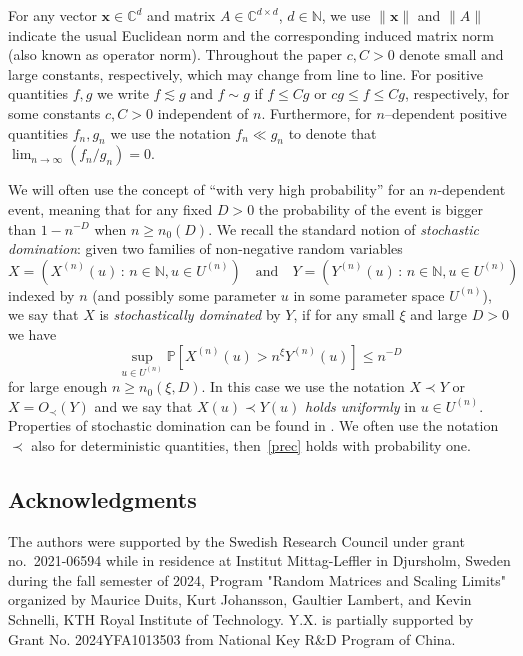 \documentclass[10pt,reqno]{amsart}
\newcommand{\N}{{\mathbb{N}}}
\newcommand{\C}{{\mathbb{C}}}
\newcommand{\<}{\langle}
\renewcommand{\>}{\rangle}
\numberwithin{equation}{section}
\begin{document}
For any vector $\mathbf{x} \in \C^{d}$ and matrix $A\in \C^{d \times d}$, $d\in \N$, we use $\lVert\mathbf{x}\rVert$ and $\lVert A\rVert$ indicate the usual Euclidean norm and the corresponding induced matrix norm (also known as operator norm). 
Throughout the paper $c,C>0$ denote small and large constants, respectively, which may change from line to line.  For positive quantities $f,g$ we write $f\lesssim g$ and $f\sim g$ if $f \le C g$ or $c g\le f\le Cg$, respectively, for some constants $c,C>0$ independent of $n$. Furthermore, for $n$--dependent positive
quantities $f_n,g_n$ we use the notation $f_n\ll g_n$ to denote that $\lim_{n\to\infty} (f_n/g_n)=0$. 



We will often use the concept of ``with very high probability'' for an $n$-dependent event, meaning that for any fixed $D>0$ the probability of the event is bigger than $1-n^{-D}$ when $n\ge n_0(D)$. We recall the standard notion of \emph{stochastic domination}:  
given two families of non-negative random variables
\[
X=\left(X^{(n)}(u) \,:\, n\in\N, u\in U^{(n)}\right)\quad\text{and}\quad Y=\left(Y^{(n)}(u) \,:\, n\in\N, u\in U^{(n)}\right)
\] 
indexed by $n$ (and possibly some parameter $u$  in some parameter space $U^{(n)}$), 
we say that $X$ is {\it stochastically dominated} by $Y$, if for any small $\xi$ and large $D>0$ we have 
\begin{equation}
	\label{prec}
	\sup_{u\in U^{(n)}} \mathbb{P}\left[X^{(n)}(u)>n^\xi  Y^{(n)}(u)\right]\le n^{-D}
\end{equation}
for large enough $n\geq n_0(\xi,D)$. In this case we use the notation $X\prec Y$ or $X= O_\prec(Y)$
and we say that $X(u)\prec Y(u)$ {\it holds uniformly} in $u\in U^{(n)}$. Properties of stochastic domination can be found in \cite[Proposition 6.5]{zbMATH06780221}. We often use the notation $\prec$ also for deterministic quantities, then~\eqref{prec} holds with probability one. 

\subsection*{Acknowledgments}

{\small The authors were supported by the Swedish Research Council under grant no.\ 2021-06594 while in residence at Institut Mittag-Leffler in Djursholm, Sweden during the fall semester of 2024, Program "Random Matrices and Scaling Limits" organized by 
Maurice Duits, Kurt Johansson, Gaultier Lambert, and Kevin Schnelli, KTH Royal Institute of Technology. Y.X. is partially supported by Grant No. 2024YFA1013503 from National Key R\&D Program of China.}
\end{document}
